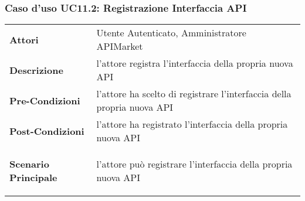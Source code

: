 \subsubsection{Caso d'uso UC11.2: Registrazione Interfaccia API}
\label{UC11.2}

\renewcommand*{\arraystretch}{1.6}
\begin{longtable}{ l | p{11cm}}
	\hline
	\rowcolor{Gray}
	\multicolumn{2}{c}{UC11.2: Registrazione Interfaccia API} \\
	\hline
	\textbf{Attori} &Utente Autenticato, Amministratore APIMarket \\
	\textbf{Descrizione} & l'attore registra l'interfaccia della propria nuova API \\
	\textbf{Pre-Condizioni} & l'attore ha scelto di registrare l'interfaccia della propria nuova API\\
	\textbf{Post-Condizioni}&l'attore ha registrato l'interfaccia della propria nuova API\\
	\textbf{Scenario Principale} & \begin{enumerate*}[label=(\arabic*.),itemjoin={\newline}]
		\item l'attore può registrare l'interfaccia della propria nuova API
	\end{enumerate*}\\
\end{longtable}



